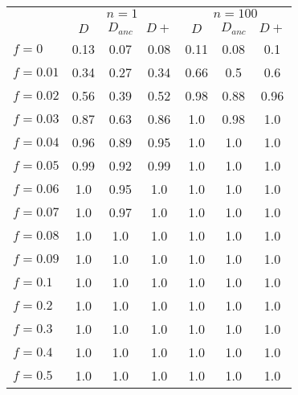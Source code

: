 \begin{tabular}{@{}lcccccc@{}}
\toprule
 & \multicolumn{3}{c}{$n=1$} & \multicolumn{3}{c}{$n=100$} \\
\cmidrule(lr){2-4} \cmidrule(lr){5-7}
 & $D$ & $D_{anc}$ & $D+$ & $D$ & $D_{anc}$ & $D+$ \\
\midrule
$f = 0$ & 0.13 & 0.07 & 0.08 & 0.11 & 0.08 & 0.1 \\
$f = 0.01$ & 0.34 & 0.27 & 0.34 & 0.66 & 0.5 & 0.6 \\
$f = 0.02$ & 0.56 & 0.39 & 0.52 & 0.98 & 0.88 & 0.96 \\
$f = 0.03$ & 0.87 & 0.63 & 0.86 & 1.0 & 0.98 & 1.0 \\
$f = 0.04$ & 0.96 & 0.89 & 0.95 & 1.0 & 1.0 & 1.0 \\
$f = 0.05$ & 0.99 & 0.92 & 0.99 & 1.0 & 1.0 & 1.0 \\
$f = 0.06$ & 1.0 & 0.95 & 1.0 & 1.0 & 1.0 & 1.0 \\
$f = 0.07$ & 1.0 & 0.97 & 1.0 & 1.0 & 1.0 & 1.0 \\
$f = 0.08$ & 1.0 & 1.0 & 1.0 & 1.0 & 1.0 & 1.0 \\
$f = 0.09$ & 1.0 & 1.0 & 1.0 & 1.0 & 1.0 & 1.0 \\
$f = 0.1$ & 1.0 & 1.0 & 1.0 & 1.0 & 1.0 & 1.0 \\
$f = 0.2$ & 1.0 & 1.0 & 1.0 & 1.0 & 1.0 & 1.0 \\
$f = 0.3$ & 1.0 & 1.0 & 1.0 & 1.0 & 1.0 & 1.0 \\
$f = 0.4$ & 1.0 & 1.0 & 1.0 & 1.0 & 1.0 & 1.0 \\
$f = 0.5$ & 1.0 & 1.0 & 1.0 & 1.0 & 1.0 & 1.0 \\
\bottomrule
\end{tabular}
